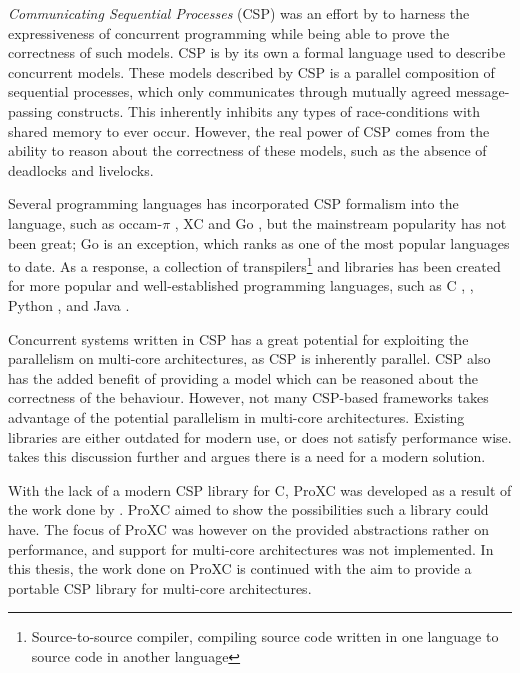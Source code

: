 \textit{Communicating Sequential Processes} (CSP) was an effort by \citet{hoare1978communicating} to harness the expressiveness of concurrent programming while being able to prove the correctness of such models. CSP is by its own a formal language used to describe concurrent models. These models described by CSP is a parallel composition of sequential processes, which only communicates through mutually agreed message\hyp{}passing constructs. This inherently inhibits any types of race\hyp{}conditions with shared memory to ever occur. However, the real power of CSP comes from the ability to reason about the correctness of these models, such as the absence of deadlocks and livelocks.  

Several programming languages has incorporated CSP formalism into the language, such as occam-$\pi$ \citep{barrett1992occam}, XC \citep{douglas2009programming} and Go \citep{go2009go}, but the mainstream popularity has not been great; Go is an exception, which ranks as one of the most popular languages to date. As a response, a collection of transpilers\footnote{Source\hyp{}to\hyp{}source compiler, compiling source code written in one language to source code in another language} and libraries has been created for more popular and well\hyp{}established programming languages, such as C \citep{pettersen2016proxc}, \Cpp{} \citep{brown2003c++csp,brown2007c++csp2,chalmers2016cppcsp}, Python \citep{bjorndalen2007pycsp}, and Java \citep{welch2007jcsp}. 

Concurrent systems written in CSP has a great potential for exploiting the parallelism on multi\hyp{}core architectures, as CSP is inherently parallel. CSP also has the added benefit of providing a model which can be reasoned about the correctness of the behaviour. However, not many CSP\hyp{}based frameworks takes advantage of the potential parallelism in multi\hyp{}core architectures. Existing libraries are either outdated for modern use, or does not satisfy performance wise.  takes this discussion further and argues there is a need for a modern solution.

With the lack of a modern CSP library for C, ProXC was developed as a result of the work done by \citet{pettersen2016proxc}. ProXC aimed to show the possibilities such a library could have. The focus of ProXC was however on the provided abstractions rather on performance, and support for multi\hyp{}core architectures was not implemented. In this thesis, the work done on ProXC is continued with the aim to provide a portable CSP library for multi\hyp{}core architectures. 

